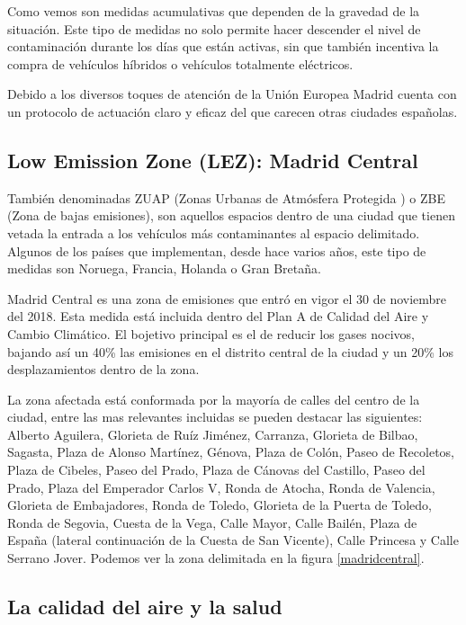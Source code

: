Como vemos son medidas acumulativas que dependen de la gravedad de la situación. Este tipo de medidas no solo permite hacer descender el nivel de contaminación durante los días que están activas, sin que también incentiva la compra de vehículos híbridos o vehículos totalmente eléctricos. 

Debido a los diversos toques de atención de la Unión Europea Madrid cuenta con un protocolo de actuación claro y eficaz del que carecen otras ciudades españolas.

 \subsection{Low Emission Zone (LEZ): Madrid  Central}
También denominadas ZUAP (Zonas Urbanas de Atmósfera Protegida \cite{wayback_2012}) o ZBE (Zona de bajas emisiones), son aquellos espacios dentro de una ciudad que tienen vetada la entrada a los vehículos más contaminantes al espacio delimitado. Algunos de los países que implementan, desde hace varios años, este tipo de medidas son Noruega, Francia, Holanda o Gran Bretaña. 

Madrid Central es una zona de emisiones que  entró en vigor el 30 de noviembre del 2018. Esta medida está incluida dentro del Plan A de Calidad del Aire y Cambio Climático. El bojetivo principal es el de reducir los gases nocivos, bajando así un 40\% las emisiones en el distrito central de la ciudad y un 20\% los desplazamientos dentro de la zona.

La zona afectada está conformada por la mayoría de calles del centro de la ciudad, entre las mas relevantes incluidas se pueden destacar las siguientes: Alberto Aguilera, Glorieta de Ruíz Jiménez, Carranza, Glorieta de Bilbao, Sagasta, Plaza de Alonso Martínez, Génova, Plaza de Colón, Paseo de Recoletos, Plaza de Cibeles, Paseo del Prado, Plaza de Cánovas del Castillo, Paseo del Prado, Plaza del Emperador Carlos V, Ronda de Atocha, Ronda de Valencia, Glorieta de Embajadores, Ronda de Toledo, Glorieta de la Puerta de Toledo, Ronda de Segovia, Cuesta de la Vega, Calle Mayor, Calle Bailén, Plaza de España (lateral continuación de la Cuesta de San Vicente), Calle Princesa y Calle Serrano Jover. Podemos ver la zona delimitada en la figura \ref{madridcentral}.


 \subsection{La calidad del aire y la salud}


